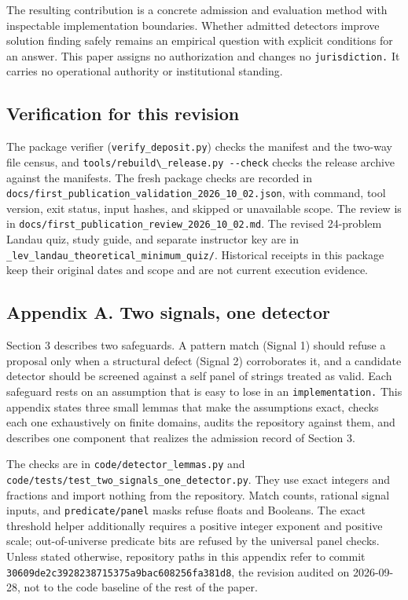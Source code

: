 \documentclass[
  11pt,
]{article}
\newcommand{\passthrough}[1]{#1}
\begin{document}
The resulting contribution is a concrete admission and evaluation method
with inspectable implementation boundaries. Whether admitted detectors
improve solution finding safely remains an empirical question with
explicit conditions for an answer. This paper assigns no authorization
and changes no \nolinkurl{jurisdiction.} It carries no operational
authority or institutional standing.

\subsection{Verification for this
revision}\label{verification-for-this-revision}

The package verifier (\nolinkurl{verify_deposit.py}) checks the manifest
and the two-way file census, and
\passthrough{\lstinline!tools/rebuild\_release.py --check!} checks the
release archive against the manifests. The fresh package checks are
recorded in
\nolinkurl{docs/first_publication_validation_2026_10_02.json}, with
command, tool version, exit status, input hashes, and skipped or
unavailable scope. The review is in
\nolinkurl{docs/first_publication_review_2026_10_02.md}. The revised
24-problem Landau quiz, study guide, and separate instructor key are in
\nolinkurl{_lev_landau_theoretical_minimum_quiz/}. Historical receipts
in this package keep their original dates and scope and are not current
execution evidence.

\subsection{Appendix A. Two signals, one
detector}\label{appendix-a.-two-signals-one-detector}

Section 3 describes two safeguards. A pattern match (Signal 1) should
refuse a proposal only when a structural defect (Signal 2) corroborates
it, and a candidate detector should be screened against a self panel of
strings treated as valid. Each safeguard rests on an assumption that is
easy to lose in an \nolinkurl{implementation.} This appendix states
three small lemmas that make the assumptions exact, checks each one
exhaustively on finite domains, audits the repository against them, and
describes one component that realizes the admission record of Section 3.

The checks are in \nolinkurl{code/detector_lemmas.py} and
\nolinkurl{code/tests/test_two_signals_one_detector.py}. They use exact
integers and fractions and import nothing from the repository. Match
counts, rational signal inputs, and \nolinkurl{predicate/panel} masks
refuse floats and Booleans. The exact threshold helper additionally
requires a positive integer exponent and positive scale; out-of-universe
predicate bits are refused by the universal panel checks. Unless stated
otherwise, repository paths in this appendix refer to commit
\nolinkurl{30609de2c3928238715375a9bac608256fa381d8}, the revision
audited on 2026-09-28, not to the code baseline of the rest of the
paper.
\end{document}
